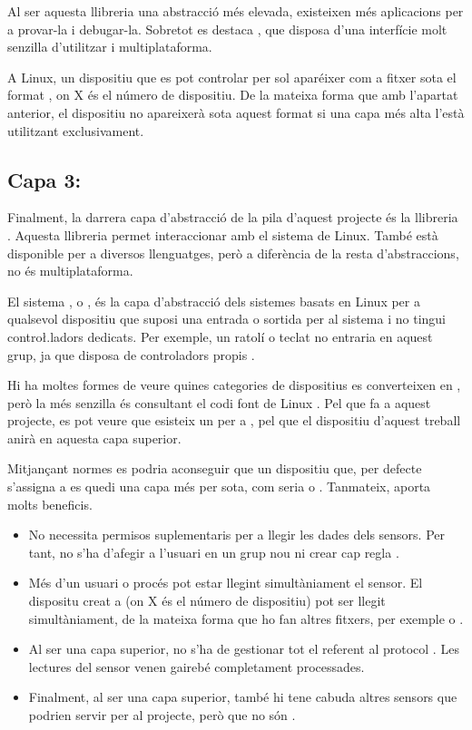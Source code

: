 Al ser aquesta llibreria una abstracció més elevada, existeixen més aplicacions
per a provar-la i debugar-la. Sobretot es destaca \cite{LibhidUI}, que disposa
d'una interfície molt senzilla d'utilitzar i multiplataforma.

A Linux, un dispositiu que es pot controlar per  sol aparéixer com
a fitxer sota el format , on X és el número de dispositiu.
De la mateixa forma que amb l'apartat anterior, el dispositiu no apareixerà
sota aquest format si una capa més alta l'està utilitzant exclusivament.

\subsection{Capa 3: }

Finalment, la darrera capa d'abstracció de la pila d'aquest projecte és la
llibreria .
Aquesta llibreria permet interaccionar amb el sistema
 de Linux. També està disponible per a diversos llenguatges, però
a diferència de la resta d'abstraccions, no és multiplataforma.

El sistema , o , és la capa d'abstracció
dels sistemes basats en Linux per a qualsevol dispositiu que suposi una entrada
o sortida per al sistema i no tingui contro\l.ladors dedicats. Per exemple, un
ratolí o teclat no entraria en aquest grup, ja que disposa de controladors
propis \cite{Iio}.

Hi ha moltes formes de veure quines categories de dispositius  es
converteixen en , però la més senzilla és consultant el codi
font de Linux \cite{KernelIioAccel}. Pel que fa a aquest projecte, es pot veure
que esisteix un  per a , pel que
el dispositiu d'aquest treball anirà en aquesta capa superior.

Mitjançant normes  es podria aconseguir que un dispositiu que, per 
defecte s'assigna a  es quedi una capa més per sota, com seria
 o . Tanmateix,  aporta molts beneficis.

\begin{itemize}
    \item No necessita permisos suplementaris per a llegir les dades dels
    sensors. Per tant, no s'ha d'afegir a l'usuari en un grup nou ni crear
    cap regla .
    \item Més d'un usuari o procés pot estar llegint simultàniament el sensor.
    El dispositu creat a  (on X és el número de
    dispositiu) pot ser llegit simultàniament, de la mateixa forma que ho fan
    altres fitxers, per exemple  o .
    \item Al ser una capa superior, no s'ha de gestionar tot el referent al
    protocol . Les lectures del sensor venen gairebé completament
    processades.
    \item Finalment, al ser una capa superior, també hi tene cabuda altres
    sensors que podrien servir per al projecte, però que no són .
\end{itemize}

